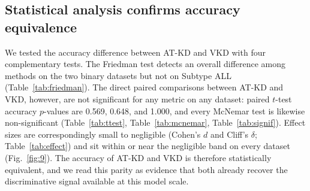 \documentclass[preprint,review,12pt]{elsarticle}
\begin{document}
\subsection{Statistical analysis confirms accuracy equivalence}

We tested the accuracy difference between AT-KD and VKD with four
complementary tests. The Friedman test detects an overall difference
among methods on the two binary datasets but not on Subtype ALL
(Table~\ref{tab:friedman}). The direct paired comparisons between AT-KD
and VKD, however, are not significant for any metric on any dataset:
paired $t$-test accuracy $p$-values are 0.569, 0.648, and 1.000, and
every McNemar test is likewise non-significant (Table~\ref{tab:ttest},
Table~\ref{tab:mcnemar}, Table~\ref{tab:signif}). Effect sizes are
correspondingly small to negligible (Cohen's $d$ and Cliff's $\delta$;
Table~\ref{tab:effect}) and sit within or near the negligible band on
every dataset (Fig.~\ref{fig:9}). The accuracy of AT-KD and VKD is
therefore statistically equivalent, and we read this parity as evidence
that both already recover the discriminative signal available at this
model scale.
\end{document}
